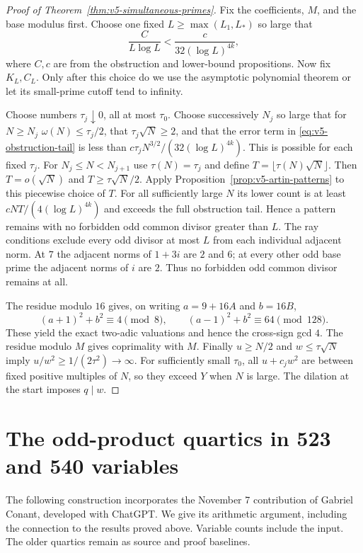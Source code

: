 \begin{proof}[Proof of Theorem~\ref{thm:v5-simultaneous-primes}]
Fix the coefficients, $M$, and the base modulus first. Choose one fixed
$L\geq\max(L_1,L_*)$ so large that
\[
 \frac C{L\log L}<\frac c{32(\log L)^{4k}},
\]
where $C,c$ are from the obstruction and lower-bound propositions.
Now fix $K_L,C_L$. Only after this choice do we use the asymptotic
polynomial theorem or let its small-prime cutoff tend to infinity.

Choose numbers $\tau_j\downarrow0$, all at most $\tau_0$.
Choose successively $N_j$ so large that for $N\geq N_j$
$\omega(N)\leq\tau_j/2$,
that $\tau_j\sqrt N\geq2$, and that the error term in
\eqref{eq:v5-obstruction-tail} is less than
$c\tau_jN^{3/2}/(32(\log L)^{4k})$.
This is possible for each fixed $\tau_j$.
For $N_j\leq N<N_{j+1}$ use $\tau(N)=\tau_j$ and define
$T=\lfloor\tau(N)\sqrt N\rfloor$.
Then $T=o(\sqrt N)$ and $T\geq\tau\sqrt N/2$.
Apply Proposition~\ref{prop:v5-artin-patterns} to this piecewise choice
of $T$. For all sufficiently large $N$ its lower count is at least
$cNT/(4(\log L)^{4k})$ and exceeds the full obstruction tail.
Hence a pattern remains with no forbidden odd
common divisor greater than $L$.
The ray conditions exclude every odd divisor at most $L$ from each
individual adjacent norm. At $7$ the adjacent norms of $1+3i$ are $2$
and $6$; at every other odd base prime the adjacent norms of $i$ are $2$.
Thus no forbidden odd common divisor remains at all.

The residue modulo $16$ gives, on writing $a=9+16A$ and $b=16B$,
\[
 (a+1)^2+b^2\equiv4\pmod8,\qquad
 (a-1)^2+b^2\equiv64\pmod{128}.
\]
These yield the exact two-adic valuations and hence the cross-sign gcd
$4$. The residue modulo $M$ gives coprimality with $M$.
Finally $u\geq N/2$ and $w\leq\tau\sqrt N$ imply
$u/w^2\geq1/(2\tau^2)\to\infty$.
For sufficiently small $\tau_0$, all $u+c_jw^2$ are between fixed positive
multiples of $N$, so they exceed $Y$ when $N$ is large.
The dilation at the start imposes $q\mid w$.
\end{proof}

\section{The odd-product quartics in 523 and 540 variables}\label{sec:v9}

The following construction incorporates the November 7 contribution of
Gabriel Conant, developed with ChatGPT. We give its arithmetic argument,
including the connection to the results proved above. Variable counts
include the input. The older quartics remain as source and proof baselines.

